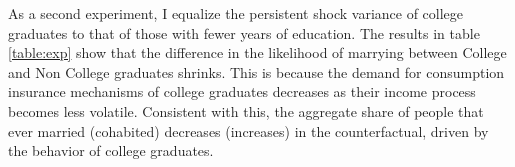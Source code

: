 \documentclass[12pt]{article}
\begin{document}
 
 As a second experiment, I equalize the persistent shock variance of college graduates to that of those with fewer years of education. The results in table \ref{table:exp} show that the difference in the likelihood of marrying between College and Non College graduates shrinks. This is because the demand for consumption insurance mechanisms of college graduates decreases as their income process becomes less volatile. Consistent with this, the aggregate share of people that ever married (cohabited) decreases (increases) in the counterfactual, driven by the behavior of college graduates.
\end{document}
